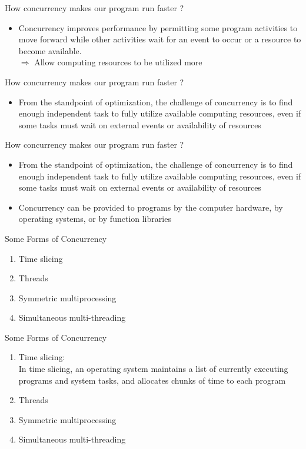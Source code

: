 \documentclass[aspectratio=169,xcolor=dvipsnames]{beamer}
\begin{document}
\begin{frame}{How concurrency makes our program run faster ?}
    \begin{itemize}
        \item Concurrency improves performance by permitting some program activities to move forward while other activities wait for an event to occur or a resource to become available.\\
        $\Rightarrow$ Allow computing resources to be utilized more
    \end{itemize}
\end{frame}

\begin{frame}{How concurrency makes our program run faster ?}
\begin{itemize}
    \item From the standpoint of optimization, the challenge of concurrency is to find enough independent task to fully utilize available computing resources, even if some tasks must wait on external events or availability of resources
\end{itemize}
\end{frame}

\begin{frame}{How concurrency makes our program run faster ?}
\begin{itemize}
    \item From the standpoint of optimization, the challenge of concurrency is to find enough independent task to fully utilize available computing resources, even if some tasks must wait on external events or availability of resources
    \item Concurrency can be provided to programs by the computer hardware, by operating systems, or by function libraries
\end{itemize}
\end{frame}

\begin{frame}{Some Forms of Concurrency}
    \begin{enumerate}
        \item Time slicing
        \item Threads
        \item Symmetric multiprocessing
        \item Simultaneous multi-threading
    \end{enumerate}
\end{frame}

\begin{frame}{Some Forms of Concurrency}
    \begin{enumerate}
        \item Time slicing:\\
        In time slicing, an operating system maintains a list of currently executing programs and system tasks, and allocates chunks of time to each program
        \item Threads
        \item Symmetric multiprocessing
        \item Simultaneous multi-threading
    \end{enumerate}
\end{frame}
\end{document}
